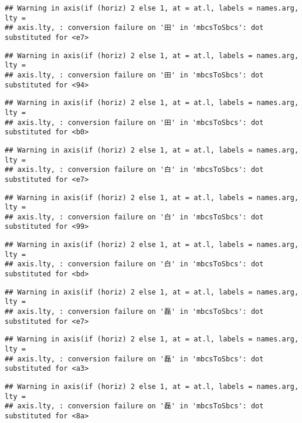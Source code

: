 \documentclass[
]{article}
\begin{document}
\begin{verbatim}
## Warning in axis(if (horiz) 2 else 1, at = at.l, labels = names.arg, lty =
## axis.lty, : conversion failure on '田' in 'mbcsToSbcs': dot substituted for <e7>
\end{verbatim}

\begin{verbatim}
## Warning in axis(if (horiz) 2 else 1, at = at.l, labels = names.arg, lty =
## axis.lty, : conversion failure on '田' in 'mbcsToSbcs': dot substituted for <94>
\end{verbatim}

\begin{verbatim}
## Warning in axis(if (horiz) 2 else 1, at = at.l, labels = names.arg, lty =
## axis.lty, : conversion failure on '田' in 'mbcsToSbcs': dot substituted for <b0>
\end{verbatim}

\begin{verbatim}
## Warning in axis(if (horiz) 2 else 1, at = at.l, labels = names.arg, lty =
## axis.lty, : conversion failure on '白' in 'mbcsToSbcs': dot substituted for <e7>
\end{verbatim}

\begin{verbatim}
## Warning in axis(if (horiz) 2 else 1, at = at.l, labels = names.arg, lty =
## axis.lty, : conversion failure on '白' in 'mbcsToSbcs': dot substituted for <99>
\end{verbatim}

\begin{verbatim}
## Warning in axis(if (horiz) 2 else 1, at = at.l, labels = names.arg, lty =
## axis.lty, : conversion failure on '白' in 'mbcsToSbcs': dot substituted for <bd>
\end{verbatim}

\begin{verbatim}
## Warning in axis(if (horiz) 2 else 1, at = at.l, labels = names.arg, lty =
## axis.lty, : conversion failure on '磊' in 'mbcsToSbcs': dot substituted for <e7>
\end{verbatim}

\begin{verbatim}
## Warning in axis(if (horiz) 2 else 1, at = at.l, labels = names.arg, lty =
## axis.lty, : conversion failure on '磊' in 'mbcsToSbcs': dot substituted for <a3>
\end{verbatim}

\begin{verbatim}
## Warning in axis(if (horiz) 2 else 1, at = at.l, labels = names.arg, lty =
## axis.lty, : conversion failure on '磊' in 'mbcsToSbcs': dot substituted for <8a>
\end{verbatim}
\end{document}
